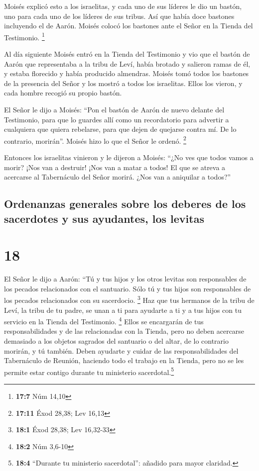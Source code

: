  Moisés explicó esto a los israelitas, y cada uno de sus
líderes le dio un bastón, uno para cada uno de los líderes de sus
tribus. Así que había doce bastones incluyendo el de Aarón.
 Moisés colocó los bastones ante el Señor en la Tienda del
Testimonio. \footnote{\textbf{17:7} Núm 14,10}

 Al día siguiente Moisés entró en la Tienda del Testimonio
y vio que el bastón de Aarón que representaba a la tribu de Leví, había
brotado y salieron ramas de él, y estaba florecido y había producido
almendras.  Moisés tomó todos los bastones de la presencia
del Señor y los mostró a todos los israelitas. Ellos los vieron, y cada
hombre recogió su propio bastón.

 El Señor le dijo a Moisés: ``Pon el bastón de Aarón de
nuevo delante del Testimonio, para que lo guardes allí como un
recordatorio para advertir a cualquiera que quiera rebelarse, para que
dejen de quejarse contra mí. De lo contrario, morirán''. 
Moisés hizo lo que el Señor le ordenó. \footnote{\textbf{17:11} Éxod
  28,38; Lev 16,13}

 Entonces los israelitas vinieron y le dijeron a Moisés:
``¿No ves que todos vamos a morir? ¡Nos van a destruir! ¡Nos van a matar
a todos!  El que se atreva a acercarse al Tabernáculo del
Señor morirá. ¿Nos van a aniquilar a todos?''

\hypertarget{ordenanzas-generales-sobre-los-deberes-de-los-sacerdotes-y-sus-ayudantes-los-levitas}{%
\subsection{Ordenanzas generales sobre los deberes de los sacerdotes y
sus ayudantes, los
levitas}\label{ordenanzas-generales-sobre-los-deberes-de-los-sacerdotes-y-sus-ayudantes-los-levitas}}

\hypertarget{section-17}{%
\section{18}\label{section-17}}

 El Señor le dijo a Aarón: ``Tú y tus hijos y los otros
levitas son responsables de los pecados relacionados con el santuario.
Sólo tú y tus hijos son responsables de los pecados relacionados con su
sacerdocio. \footnote{\textbf{18:1} Éxod 28,38; Lev 16,32-33}
 Haz que tus hermanos de la tribu de Leví, la tribu de tu
padre, se unan a ti para ayudarte a ti y a tus hijos con tu servicio en
la Tienda del Testimonio. \footnote{\textbf{18:2} Núm 3,6-10}
 Ellos se encargarán de tus responsabilidades y de las
relacionadas con la Tienda, pero no deben acercarse demasiado a los
objetos sagrados del santuario o del altar, de lo contrario morirán, y
tú también.  Deben ayudarte y cuidar de las
responsabilidades del Tabernáculo de Reunión, haciendo todo el trabajo
en la Tienda, pero no se les permite estar contigo durante tu ministerio
sacerdotal.\footnote{\textbf{18:4} ``Durante tu ministerio sacerdotal'':
  añadido para mayor claridad.}

